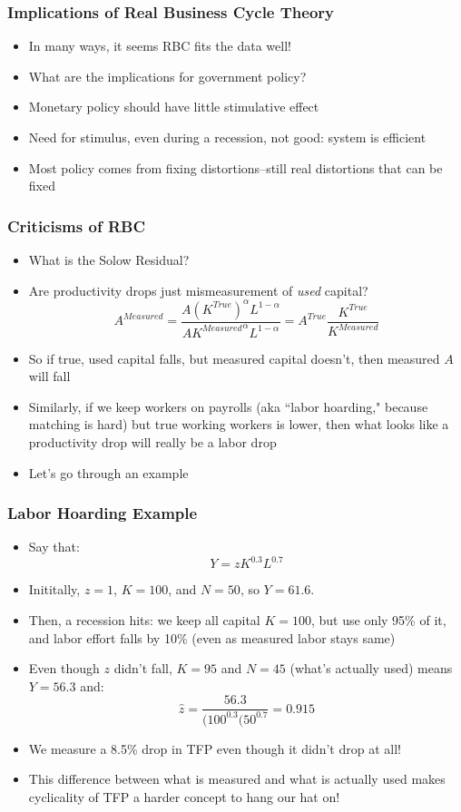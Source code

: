 \documentclass{beamer}
\begin{document}
\begin{frame}
\frametitle[alignment=center]{Implications of Real Business Cycle Theory}
\begin{itemize}
\item In many ways, it seems RBC fits the data well!
\bigskip
\item What are the implications for government policy?
\bigskip
\item Monetary policy should have little stimulative effect
\bigskip
\item Need for stimulus, even during a recession, not good: system is efficient
\bigskip
\item  Most policy comes from fixing distortions--still real distortions that can be fixed
\end{itemize}
\end{frame}

\begin{frame}
\frametitle[alignment=center]{Criticisms of RBC}
\begin{itemize}
\item What is the Solow Residual?  
\bigskip
\item Are productivity drops just mismeasurement of \emph{used} capital?  $$A^{Measured}=\frac{A(K^{True})^\alpha L^{1-\alpha}}{A{K^{Measured}}^\alpha L^{1-\alpha}}=A^{True}\frac{K^{True}}{K^{Measured}}$$
\bigskip
\item So if true, used capital falls, but measured capital doesn't, then measured $A$ will fall
\bigskip
\item Similarly, if we keep workers on payrolls (aka ``labor hoarding," because matching is hard) but true working workers is lower, then what looks like a productivity drop will really be a labor drop
\bigskip
\item Let's go through an example
\end{itemize}
\end{frame}

\begin{frame}
\frametitle[alignment=center]{Labor Hoarding Example}
\begin{itemize}
\item Say that:
$$Y=zK^{0.3}L^{0.7}$$
\item Inititally, $z=1$, $K=100$, and $N=50$, so $Y=61.6$.  
\item Then, a recession hits:  we keep all capital $K=100$, but use only 95\% of it, and labor effort falls by 10\% (even as measured labor stays same)
\item Even though $z$ didn't fall, $K=95$ and $N=45$ (what's actually used) means $Y=56.3$ and:
$$\hat{z}=\frac{56.3}{(100^{0.3}(50^{0.7}}=0.915$$
\item We measure a 8.5\% drop in TFP even though it didn't drop at all!
\bigskip
\item This difference between what is measured and what is actually used makes cyclicality of TFP a harder concept to hang our hat on!
\end{itemize}
\end{frame}
\end{document}
